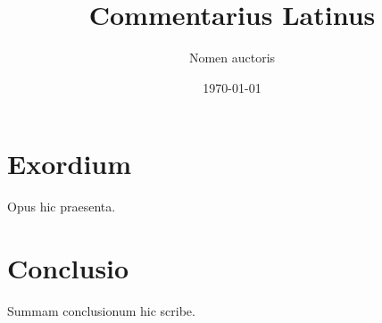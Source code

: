 \documentclass[12pt]{report}
\title{Commentarius Latinus}
\author{Nomen auctoris}
\date{\today}
\begin{document}
\maketitle
\tableofcontents

\chapter{Exordium}
Opus hic praesenta.

\chapter{Conclusio}
Summam conclusionum hic scribe.

% 
\end{document}

